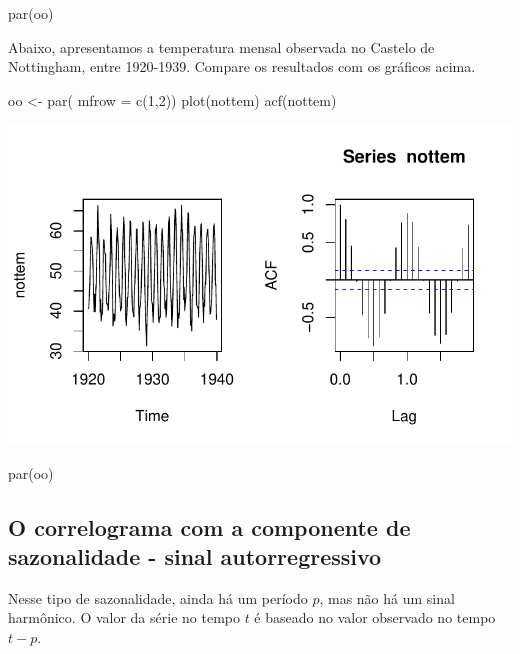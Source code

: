 \documentclass[
  letterpaper,
  DIV=11,
  numbers=noendperiod]{scrreprt}
\newenvironment{Shaded}{\begin{snugshade}}{\end{snugshade}}
\newcommand{\AttributeTok}[1]{\textcolor[rgb]{0.40,0.45,0.13}{#1}}
\newcommand{\DecValTok}[1]{\textcolor[rgb]{0.68,0.00,0.00}{#1}}
\newcommand{\FunctionTok}[1]{\textcolor[rgb]{0.28,0.35,0.67}{#1}}
\newcommand{\NormalTok}[1]{\textcolor[rgb]{0.00,0.23,0.31}{#1}}
\newcommand{\OtherTok}[1]{\textcolor[rgb]{0.00,0.23,0.31}{#1}}
\begin{document}
\begin{Shaded}
\begin{Highlighting}[]
\FunctionTok{par}\NormalTok{(oo)}
\end{Highlighting}
\end{Shaded}

Abaixo, apresentamos a temperatura mensal observada no Castelo de
Nottingham, entre 1920-1939. Compare os resultados com os gráficos
acima.

\begin{Shaded}
\begin{Highlighting}[]
\NormalTok{oo }\OtherTok{\textless{}{-}} \FunctionTok{par}\NormalTok{( }\AttributeTok{mfrow =} \FunctionTok{c}\NormalTok{(}\DecValTok{1}\NormalTok{,}\DecValTok{2}\NormalTok{))}
  \FunctionTok{plot}\NormalTok{(nottem)}
  \FunctionTok{acf}\NormalTok{(nottem)}
\end{Highlighting}
\end{Shaded}

\includegraphics{sinal_files/figure-pdf/unnamed-chunk-10-1.pdf}

\begin{Shaded}
\begin{Highlighting}[]
\FunctionTok{par}\NormalTok{(oo)  }
\end{Highlighting}
\end{Shaded}

\subsection{O correlograma com a componente de sazonalidade - sinal
autorregressivo}\label{o-correlograma-com-a-componente-de-sazonalidade---sinal-autorregressivo}

Nesse tipo de sazonalidade, ainda há um período \(p\), mas não há um
sinal harmônico. O valor da série no tempo \(t\) é baseado no valor
observado no tempo \(t-p\).
\end{document}
